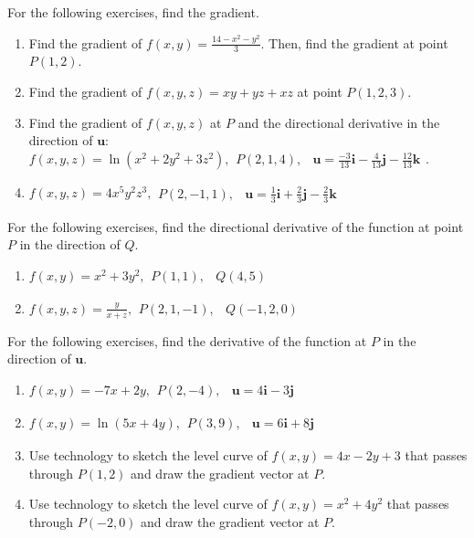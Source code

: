 \documentclass{exercises}
\begin{document}
For the following exercises, find the gradient.

\begin{enumerate}[resume]
\item Find the gradient of $f(x,y)=\frac{14-x^{2}-y^{2}}{3}$. Then, find the gradient at point $P(1,2)$.
\item Find the gradient of $f(x,y,z)=xy+yz+xz$ at point $P(1,2,3)$.
\item Find the gradient of $f(x,y,z)$ at $P$ and the directional derivative in the direction of $\mathbf{u}$: $f(x,y,z)=\ln(x^{2}+2y^{2}+3z^{2}),\begin{matrix}P(2,1,4), & \mathbf{u}=\frac{-3}{13}\mathbf{i}-\frac{4}{13}\mathbf{j}-\frac{12}{13}\mathbf{k}\end{matrix}$.
\item $f(x,y,z)=4x^{5}y^{2}z^{3},\begin{matrix}P(2,-1,1), & \mathbf{u}=\frac{1}{3}\mathbf{i}+\frac{2}{3}\mathbf{j}-\frac{2}{3}\mathbf{k}\end{matrix}$
\end{enumerate}

For the following exercises, find the directional derivative of the function at point $P$ in the direction of $Q$.

\begin{enumerate}[resume]
\item $f(x,y)=x^{2}+3y^{2},\begin{matrix}P(1,1), & Q(4,5)\end{matrix}$
\item $f(x,y,z)=\frac{y}{x+z},\begin{matrix}P(2,1,-1), & Q(-1,2,0)\end{matrix}$
\end{enumerate}

For the following exercises, find the derivative of the function at $P$ in the direction of $\mathbf{u}$.

\begin{enumerate}[resume]
\item $f(x,y)=-7x+2y,\begin{matrix}P(2,-4), & \mathbf{u}=4\mathbf{i}-3\mathbf{j}\end{matrix}$
\item $f(x,y)=\ln(5x+4y),\begin{matrix}P(3,9), & \mathbf{u}=6\mathbf{i}+8\mathbf{j}\end{matrix}$
\item \techrequired Use technology to sketch the level curve of $f(x,y)=4x-2y+3$ that passes through $P(1,2)$ and draw the gradient vector at $P$.
\item \techrequired Use technology to sketch the level curve of $f(x,y)=x^{2}+4y^{2}$ that passes through $P(-2,0)$ and draw the gradient vector at $P$.
\end{enumerate}
\end{document}
